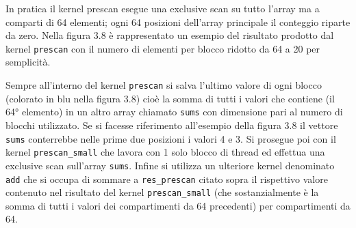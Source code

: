 \documentclass[12pt,a4paper]{report}
\begin{document}
 In pratica il kernel prescan esegue una exclusive scan su tutto l’array ma a comparti di 64 elementi; ogni 64 posizioni dell’array principale il conteggio riparte da zero. \newline 
Nella figura 3.8 è rappresentato un esempio del risultato prodotto dal kernel \verb|prescan| con il numero di elementi per blocco ridotto da 64 a 20 per semplicità.
\begin{figure}[H]
\centering
\begin{floatrow}[1]
\end{floatrow}
\end{figure} 
Sempre all’interno del kernel \verb|prescan| si salva l’ultimo valore di ogni blocco (colorato in blu nella figura 3.8) cioè la somma di tutti i valori che contiene (il 64° elemento) in un altro array chiamato \verb|sums| con dimensione pari al numero di blocchi utilizzato. Se si facesse riferimento all'esempio della figura 3.8 il vettore \verb|sums| conterrebbe nelle prime due posizioni i valori 4 e 3.
Si prosegue poi con il kernel \verb|prescan_small| che lavora con 1 solo blocco di thread ed effettua una exclusive scan sull’array \verb|sums|.
Infine si utilizza un ulteriore kernel denominato \verb|add| che si occupa di sommare a \verb|res_prescan| citato sopra il rispettivo valore contenuto nel risultato del kernel \verb|prescan_small| (che sostanzialmente è la somma di tutti i valori dei compartimenti da 64 precedenti) per compartimenti da 64. \newpage
\end{document}
